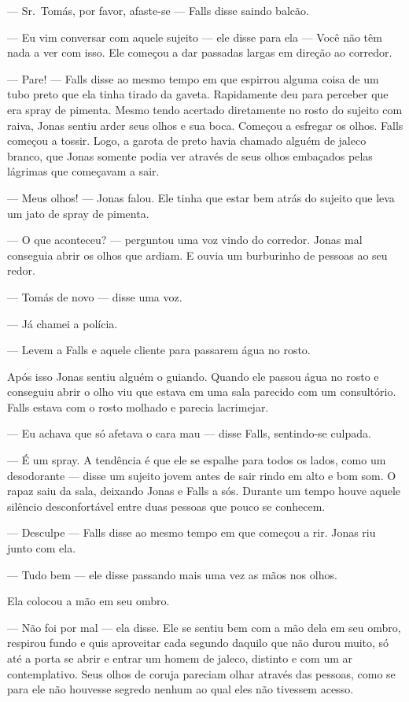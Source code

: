 --- Sr.~Tomás, por favor, afaste-se ---  Falls disse saindo balcão.

--- Eu vim conversar com aquele sujeito --- ele disse para ela --- Você não têm nada a ver com isso. Ele começou a dar passadas largas em direção ao corredor.

--- Pare! --- Falls disse ao mesmo tempo em que espirrou alguma coisa de um tubo preto que ela tinha tirado da gaveta. Rapidamente deu para perceber que era spray de pimenta. Mesmo tendo acertado diretamente no rosto do sujeito com raiva, Jonas sentiu arder seus olhos e sua boca. Começou a esfregar os olhos. Falls começou a tossir. Logo, a garota de preto havia chamado alguém de jaleco branco, que Jonas somente podia ver através de seus olhos embaçados pelas lágrimas que começavam a sair.

--- Meus olhos! --- Jonas falou. Ele tinha que estar bem atrás do sujeito que leva um jato de spray de pimenta.

--- O que aconteceu? --- perguntou uma voz vindo do corredor. Jonas mal conseguia abrir os olhos que ardiam. E ouvia um burburinho de pessoas ao seu redor.

--- Tomás\mudanca{,} de novo --- disse uma voz.

--- Já chamei a polícia.

--- Levem a Falls e aquele cliente para passarem água no rosto.

Após isso Jonas sentiu alguém o guiando. Quando ele passou água no rosto e conseguiu abrir o olho viu que estava em uma sala parecido com um consultório. Falls estava com o rosto molhado e parecia lacrimejar.

--- Eu achava que só afetava o cara mau --- disse Falls, sentindo-se culpada.

--- É um spray. A tendência é que ele se espalhe para todos os lados, como um desodorante ---  disse um sujeito jovem antes de sair rindo em alto e bom som. O rapaz saiu da sala, deixando Jonas e Falls a sós. Durante um tempo houve aquele silêncio desconfortável entre duas pessoas que pouco se conhecem.

--- Desculpe --- Falls disse ao mesmo tempo em que começou a rir. Jonas riu junto com ela.

--- Tudo bem --- ele disse passando mais uma vez as mãos nos olhos.

Ela colocou a mão em seu ombro.

--- Não foi por mal --- ela disse. Ele se sentiu bem com a mão dela em seu ombro, respirou fundo e quis aproveitar cada segundo daquilo que não durou muito, só até a porta se abrir e entrar um homem de jaleco, distinto e com um ar contemplativo. Seus olhos de coruja pareciam olhar através das pessoas, como se para ele não houvesse segredo nenhum ao qual eles não tivessem acesso.

